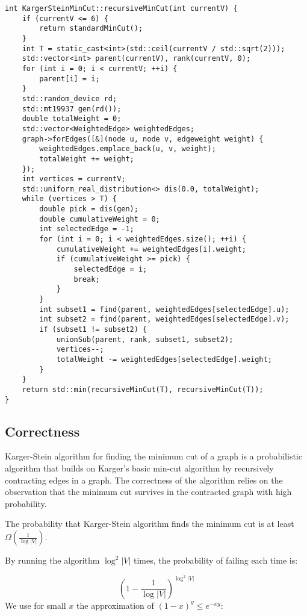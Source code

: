 \begin{verbatim}
int KargerSteinMinCut::recursiveMinCut(int currentV) {
    if (currentV <= 6) {
        return standardMinCut();
    }
    int T = static_cast<int>(std::ceil(currentV / std::sqrt(2)));
    std::vector<int> parent(currentV), rank(currentV, 0);
    for (int i = 0; i < currentV; ++i) {
        parent[i] = i;
    }
    std::random_device rd;
    std::mt19937 gen(rd());
    double totalWeight = 0;
    std::vector<WeightedEdge> weightedEdges;
    graph->forEdges([&](node u, node v, edgeweight weight) {
        weightedEdges.emplace_back(u, v, weight);
        totalWeight += weight;
    });
    int vertices = currentV;
    std::uniform_real_distribution<> dis(0.0, totalWeight);
    while (vertices > T) {
        double pick = dis(gen);
        double cumulativeWeight = 0;
        int selectedEdge = -1;
        for (int i = 0; i < weightedEdges.size(); ++i) {
            cumulativeWeight += weightedEdges[i].weight;
            if (cumulativeWeight >= pick) {
                selectedEdge = i;
                break;
            }
        }
        int subset1 = find(parent, weightedEdges[selectedEdge].u);
        int subset2 = find(parent, weightedEdges[selectedEdge].v);
        if (subset1 != subset2) {
            unionSub(parent, rank, subset1, subset2);
            vertices--;
            totalWeight -= weightedEdges[selectedEdge].weight;
        }
    }
    return std::min(recursiveMinCut(T), recursiveMinCut(T));
}
\end{verbatim}


\subsection{Correctness}

Karger-Stein algorithm for finding the minimum cut of a graph is a probabilistic algorithm that builds on Karger's basic min-cut algorithm by recursively contracting edges in a graph. The correctness of the algorithm relies on the observation that the minimum cut survives in the contracted graph with high probability.

\begin{lemma}
     The probability that Karger-Stein algorithm finds the minimum cut is at least \(\Omega\left(\frac{1}{\log |V|}\right)\).
\end{lemma}
\noindent
By running the algorithm \( \log^2 |V| \) times, the probability of failing each time is:

\[
\left(1 - \frac{1}{\log |V|}\right)^{\log^2 |V|}
\]
We use for small \(x\) the approximation of \( (1 - x)^y \leq e^{-xy} \):

